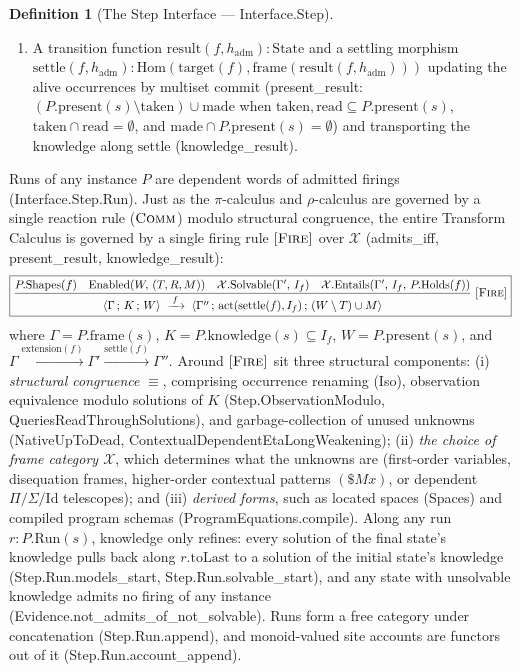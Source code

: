 \documentclass[11pt,a4paper]{article}
\theoremstyle{definition}
\newtheorem{definition}[theorem]{Definition}
\DeclareRobustCommand{\lean}[1]{%
  \ifmmode\text{\normalfont\ttfamily\footnotesize\detokenize{#1}}%
  \else{\normalfont\footnotesize\leanurl{#1}}\fi}
\DeclareRobustCommand{\metta}[1]{\text{\normalfont\ttfamily\footnotesize #1}}
\def\lean#1{#1}%
\def\metta#1{#1}%
\begin{document}
\begin{definition}[The Step Interface --- \lean{Interface.Step}]
\begin{enumerate}[leftmargin=2em, nosep]
\begin{equation}
  \end{equation}
  \item A transition function $\mathrm{result}(f, h_{\mathrm{adm}}) : \mathrm{State}$ and a settling morphism $\mathrm{settle}(f, h_{\mathrm{adm}}) : \mathrm{Hom}(\mathrm{target}(f), \mathrm{frame}(\mathrm{result}(f, h_{\mathrm{adm}})))$ updating the alive occurrences by multiset commit (\lean{present_result}: $(P.\mathrm{present}(s) \setminus \mathrm{taken}) \cup \mathrm{made}$ when $\mathrm{taken}, \mathrm{read} \subseteq P.\mathrm{present}(s)$, $\mathrm{taken} \cap \mathrm{read} = \emptyset$, and $\mathrm{made} \cap P.\mathrm{present}(s) = \emptyset$) and transporting the knowledge along $\mathrm{settle}$ (\lean{knowledge_result}).
\end{enumerate}
\end{definition}

Runs of any instance $P$ are dependent words of admitted firings (\lean{Interface.Step.Run}). Just as the $\pi$-calculus and $\rho$-calculus are governed by a single reaction rule ($\textsc{Comm}$) modulo structural congruence, the entire Transform Calculus is governed by a single firing rule $\textsc{[Fire]}$ over $\mathcal{X}$ (\lean{admits_iff}, \lean{present_result}, \lean{knowledge_result}):
\[
\fbox{$\displaystyle
\frac{
  P.\mathrm{Shapes}(f) \quad
  \mathrm{Enabled}(W,\, (T, R, M)) \quad
  \mathcal{X}.\mathrm{Solvable}(\Gamma',\, I_f) \quad
  \mathcal{X}.\mathrm{Entails}(\Gamma',\, I_f,\, P.\mathrm{Holds}(f))
}{
  \langle \Gamma \,;\, K \,;\, W \rangle
  \;\xrightarrow{\;f\;}\;
  \langle \Gamma'' \,;\, \mathrm{act}(\mathrm{settle}(f), I_f) \,;\, (W \setminus T) \cup M \rangle
}\;\textsc{[Fire]}
$}
\]
where $\Gamma = P.\mathrm{frame}(s)$, $K = P.\mathrm{knowledge}(s) \subseteq I_f$, $W = P.\mathrm{present}(s)$, and $\Gamma \xrightarrow{\mathrm{extension}(f)} \Gamma' \xrightarrow{\mathrm{settle}(f)} \Gamma''$. Around $\textsc{[Fire]}$ sit three structural components: (i) \emph{structural congruence} $\equiv$, comprising occurrence renaming (\lean{Iso}), observation equivalence modulo solutions of $K$ (\lean{Step.ObservationModulo}, \lean{QueriesReadThroughSolutions}), and garbage-collection of unused unknowns (\lean{NativeUpToDead}, \lean{ContextualDependentEtaLongWeakening}); (ii) \emph{the choice of frame category $\mathcal{X}$}, which determines what the unknowns are (first-order variables, disequation frames, higher-order contextual patterns $\metta{(\$M x)}$, or dependent $\Pi/\Sigma/\mathrm{Id}$ telescopes); and (iii) \emph{derived forms}, such as located spaces (\lean{Spaces}) and compiled program schemas (\lean{ProgramEquations.compile}). Along any run $r : P.\mathrm{Run}(s)$, knowledge only refines: every solution of the final state's knowledge pulls back along $r.\mathrm{toLast}$ to a solution of the initial state's knowledge (\lean{Step.Run.models_start}, \lean{Step.Run.solvable_start}), and any state with unsolvable knowledge admits no firing of any instance (\lean{Evidence.not_admits_of_not_solvable}). Runs form a free category under concatenation (\lean{Step.Run.append}), and monoid-valued site accounts are functors out of it (\lean{Step.Run.account_append}).
\end{document}
